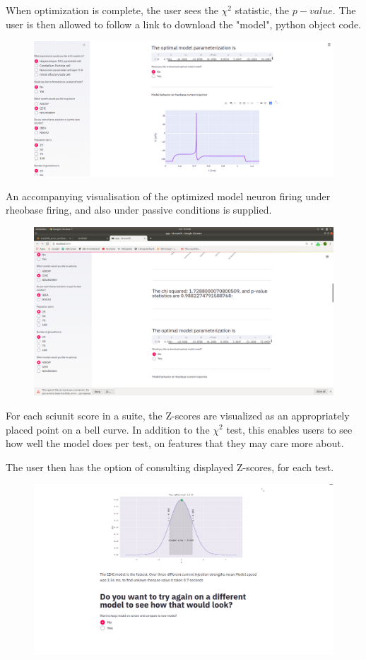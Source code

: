 When optimization is complete, the user sees the $\chi^{2}$ statistic, the $p-value$. The user is then allowed to follow a link to download the "model", python object code.\\
\begin{figure}
\includegraphics[]{chapters/app_tex/more_app_results}
\end{figure}

An accompanying visualisation of the optimized model neuron firing under rheobase firing, and also under passive conditions is supplied.
\begin{figure}
\includegraphics[]{chapters/app_tex/Screenshot from 2020-09-19 10-46-32}
\end{figure}

For each sciunit score in a suite, the Z-scores are visualized as an appropriately placed point on a bell curve. In addition to the $\chi^{2}$ test, this enables users to see how well the model does per test, on features that they may care more about.

The user then has the option of consulting displayed Z-scores, for each test.
\begin{figure}
\includegraphics[]{chapters/app_tex/Screenshot from 2020-09-19 10-47-27}
\end{figure}

